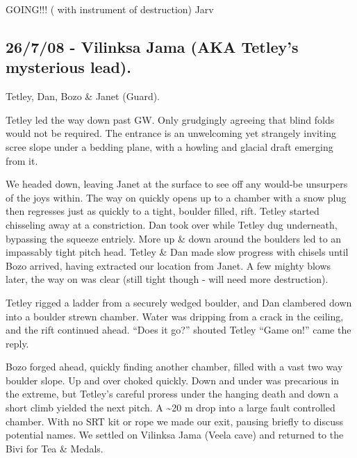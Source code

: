 GOING!!! ( with instrument of destruction) Jarv

\hypertarget{vilinksa-jama-aka-tetleys-mysterious-lead.}{%
\subsection{26/7/08 - Vilinksa Jama (AKA Tetley's mysterious
lead).}\label{vilinksa-jama-aka-tetleys-mysterious-lead.}}

Tetley, Dan, Bozo \& Janet (Guard).

Tetley led the way down past GW. Only grudgingly agreeing that blind
folds would not be required. The entrance is an unwelcoming yet
strangely inviting scree slope under a bedding plane, with a howling and
glacial draft emerging from it.

We headed down, leaving Janet at the surface to see off any would-be
unsurpers of the joys within. The way on quickly opens up to a chamber
with a snow plug then regresses just as quickly to a tight, boulder
filled, rift. Tetley started chisseling away at a constriction. Dan took
over while Tetley dug underneath, bypassing the squeeze entriely. More
up \& down around the boulders led to an impassably tight pitch head.
Tetley \& Dan made slow progress with chisels until Bozo arrived, having
extracted our location from Janet. A few mighty blows later, the way on
was clear (still tight though - will need more destruction).

Tetley rigged a ladder from a securely wedged boulder, and Dan clambered
down into a boulder strewn chamber. Water was dripping from a crack in
the ceiling, and the rift continued ahead. ``Does it go?'' shouted
Tetley ``Game on!'' came the reply.

Bozo forged ahead, quickly finding another chamber, filled with a vast
two way boulder slope. Up and over choked quickly. Down and under was
precarious in the extreme, but Tetley's careful proress under the
hanging death and down a short climb yielded the next pitch. A
\textasciitilde 20 m drop into a large fault controlled chamber. With no
SRT kit or rope we made our exit, pausing briefly to discuss potential
names. We settled on Vilinksa Jama (Veela cave) and returned to the Bivi
for Tea \& Medals. 


